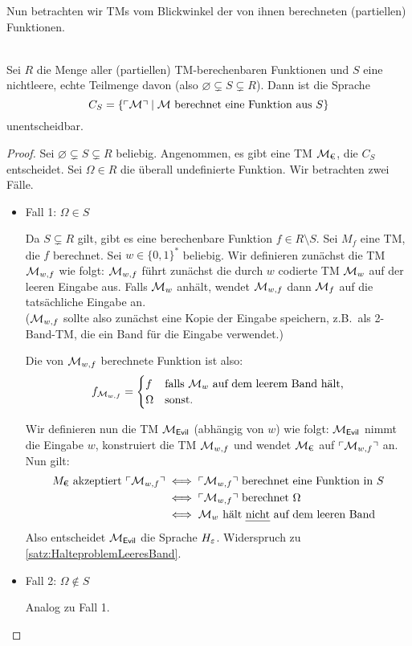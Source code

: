 Nun betrachten wir \ac{TM}s vom Blickwinkel der von ihnen berechneten
(partiellen) Funktionen.

\begin{Satz}\ \\
  Sei $R$ die Menge aller (partiellen) \ac{TM}-berechenbaren Funktionen und $S$
  eine nichtleere, echte Teilmenge davon (also $\varnothing \subsetneq S \subsetneq R$).
  Dann ist die Sprache
  $$C_S=\{\ulcorner \mathcal{M} \urcorner \mid \mathcal{M} \text{ berechnet eine Funktion aus }S\}$$
  unentscheidbar.
\end{Satz}
\begin{proof}
  Sei $\varnothing \subsetneq S \subsetneq R$ beliebig.
  Angenommen, es gibt eine \ac{TM} $\mathcal{M}_\text{€}$, die $C_S$ entscheidet.
  Sei $\Omega \in R$ die überall undefinierte Funktion. 
  Wir betrachten zwei Fälle.
  \begin{itemize}
   \item Fall 1: $\Omega \in S$
   
     Da $S\subsetneq R$ gilt, gibt es eine berechenbare Funktion $f \in R \setminus S$.
     Sei $M_f$ eine \ac{TM}, die $f$ berechnet.
     Sei $w\in\{0,1\}^*$ beliebig.
     Wir definieren zunächst die \ac{TM} $\mathcal{M}_{w, f}$ wie folgt:
     $\mathcal{M}_{w, f}$ führt zunächst die durch $w$ codierte \ac{TM} $\mathcal{M}_w$ auf der leeren Eingabe aus.
     Falls $\mathcal{M}_w$ anhält, wendet $\mathcal{M}_{w, f}$ dann $\mathcal{M}_f$ auf die tatsächliche Eingabe an.\\
     ($\mathcal{M}_{w, f}$ sollte also zunächst eine Kopie der Eingabe speichern,
     z.B.\ als 2-Band-\ac{TM}, die ein Band für die Eingabe verwendet.)
     
     Die von $\mathcal{M}_{w, f}$ berechnete Funktion ist also:
     $$f_{\mathcal{M}_{w, f}}=\begin{cases}
                      f & \text{falls } \mathcal{M}_w \text{ auf dem leerem Band hält,}\\
                      \Omega & \text{sonst.}
                      \end{cases}$$
     
     Wir definieren nun die \ac{TM} $\mathcal{M}_\textsf{Evil}$ (abhängig von $w$) wie folgt:
     $\mathcal{M}_\textsf{Evil}$ nimmt die Eingabe $w$, konstruiert die \ac{TM} $\mathcal{M}_{w, f}$ und wendet $\mathcal{M}_\text{€}$ auf $\ulcorner \mathcal{M}_{w, f} \urcorner$ an.
     Nun gilt:
     \begin{align*}
      M_\text{€} \text{ akzeptiert } \godel{\M_{w, f}}
      &\iff \godel{\M_{w, f}} \text{ berechnet eine Funktion in }S\\
      &\iff \godel{\M_{w, f}} \text{ berechnet }\Omega\\ %
      &\iff \M_w \text{ hält \emph{nicht} auf dem leeren Band}
    \end{align*}
    Also entscheidet $\mathcal{M}_\textsf{Evil}$ die Sprache $H_\varepsilon$. Widerspruch zu \autoref{satz:HalteproblemLeeresBand}.
    \item Fall 2: $\Omega \notin S$
    
    Analog zu Fall 1. \qedhere
  \end{itemize}
\end{proof}
